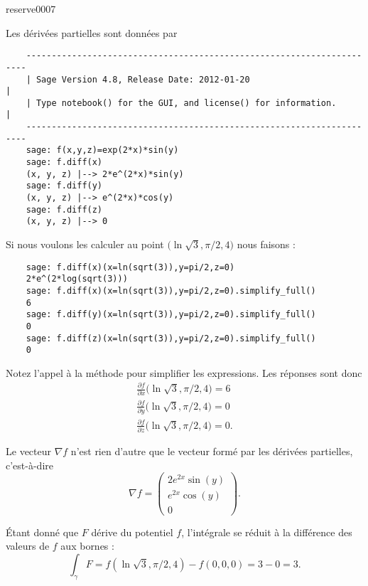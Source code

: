 

\begin{corrige}{reserve0007}

    Les dérivées partielles sont données par
    \begin{verbatim}
    ----------------------------------------------------------------------
    | Sage Version 4.8, Release Date: 2012-01-20                         |
    | Type notebook() for the GUI, and license() for information.        |
    ----------------------------------------------------------------------
    sage: f(x,y,z)=exp(2*x)*sin(y)
    sage: f.diff(x)
    (x, y, z) |--> 2*e^(2*x)*sin(y)
    sage: f.diff(y)
    (x, y, z) |--> e^(2*x)*cos(y)
    sage: f.diff(z)
    (x, y, z) |--> 0
    \end{verbatim}
    Si nous voulons les calculer au point \( \big( \ln\sqrt{3},\pi/2,4 \big)\) nous faisons :
    \begin{verbatim}
    sage: f.diff(x)(x=ln(sqrt(3)),y=pi/2,z=0) 
    2*e^(2*log(sqrt(3)))
    sage: f.diff(x)(x=ln(sqrt(3)),y=pi/2,z=0).simplify_full()
    6
    sage: f.diff(y)(x=ln(sqrt(3)),y=pi/2,z=0).simplify_full()
    0
    sage: f.diff(z)(x=ln(sqrt(3)),y=pi/2,z=0).simplify_full()
    0
    \end{verbatim}
    Notez l'appel à la méthode  pour simplifier les expressions. Les réponses sont donc
    \begin{subequations}
        \begin{align}
            \frac{ \partial f }{ \partial x }\big( \ln\sqrt{3},\pi/2,4 \big)=6\\
            \frac{ \partial f }{ \partial y }\big( \ln\sqrt{3},\pi/2,4 \big)=0\\
            \frac{ \partial f }{ \partial z }\big( \ln\sqrt{3},\pi/2,4 \big)=0.
        \end{align}
    \end{subequations}
    
    Le vecteur \( \nabla f\) n'est rien d'autre que le vecteur formé par les dérivées partielles, c'est-à-dire
    \begin{equation}
        \nabla f=\begin{pmatrix}
            2 e^{2x}\sin(y)    \\ 
            e^{2x}\cos(y)    \\ 
            0    
        \end{pmatrix}.
    \end{equation}
    
    Étant donné que \( F\) dérive du potentiel \( f\), l'intégrale se réduit à la différence des valeurs de \( f\) aux bornes :
    \begin{equation}
        \int_{\gamma}F=f(\ln\sqrt{3},\pi/2,4)-f(0,0,0)=3-0=3.
    \end{equation}

\end{corrige}
